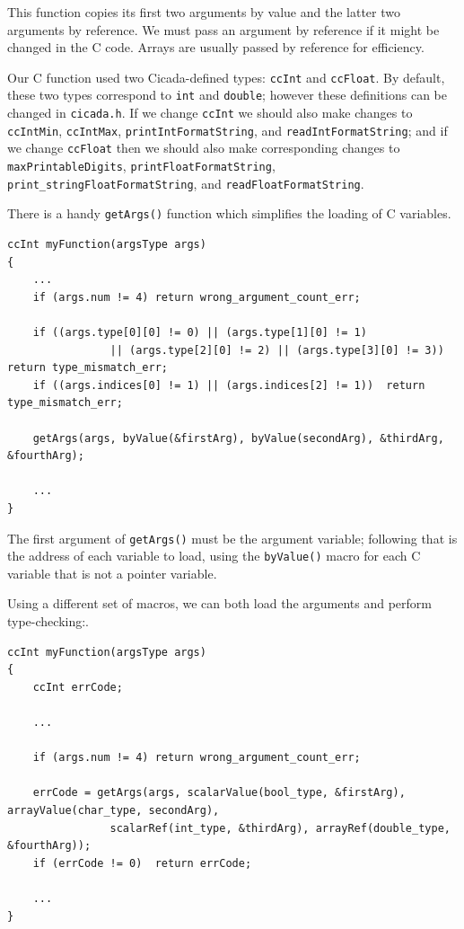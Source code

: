 \documentclass{article}
\newenvironment{code}{
       \begin{list}{}{
               \setlength{\leftmargin}{.4in}
               \setlength{\rightmargin}{0in}
               \setlength{\topsep}{.2in}
       }
       \small
       \item[] }
       { \end{list}   }
\begin{document}
\noindent This function copies its first two arguments by value and the latter two arguments by reference.  We must pass an argument by reference if it might be changed in the C code.  Arrays are usually passed by reference for efficiency.

Our C function used two Cicada-defined types:  \verb#ccInt# and \verb#ccFloat#.  By default, these two types correspond to \verb#int# and \verb#double#; however these definitions can be changed in \verb#cicada.h#.  If we change \verb#ccInt# we should also make changes to \verb#ccIntMin#, \verb#ccIntMax#, \verb#printIntFormatString#, and \verb#readIntFormatString#; and if we change \verb#ccFloat# then we should also make corresponding changes to \verb#maxPrintableDigits#, \verb#printFloatFormatString#, \verb#print_stringFloatFormatString#, and \verb#readFloatFormatString#. 

There is a handy \verb#getArgs()# function which simplifies the loading of C variables.

\begin{code} \begin{verbatim}
ccInt myFunction(argsType args)
{
    ...
    if (args.num != 4) return wrong_argument_count_err;
    
    if ((args.type[0][0] != 0) || (args.type[1][0] != 1)
                || (args.type[2][0] != 2) || (args.type[3][0] != 3))  return type_mismatch_err;
    if ((args.indices[0] != 1) || (args.indices[2] != 1))  return type_mismatch_err;
    
    getArgs(args, byValue(&firstArg), byValue(secondArg), &thirdArg, &fourthArg);
    
    ...
}
\end{verbatim} \end{code}

\noindent The first argument of \verb#getArgs()# must be the argument variable; following that is the address of each variable to load, using the \verb#byValue()# macro for each C variable that is not a pointer variable.

Using a different set of macros, we can both load the arguments and perform type-checking:.

\begin{code} \begin{verbatim}
ccInt myFunction(argsType args)
{
    ccInt errCode;
    
    ...
    
    if (args.num != 4) return wrong_argument_count_err;
    
    errCode = getArgs(args, scalarValue(bool_type, &firstArg), arrayValue(char_type, secondArg),
                scalarRef(int_type, &thirdArg), arrayRef(double_type, &fourthArg));
    if (errCode != 0)  return errCode;
    
    ...
}
\end{verbatim} \end{code}
\end{document}
